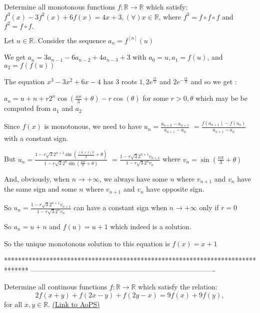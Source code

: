 \begin{solution}
	\begin{tcolorbox}Determine all monotonous functions $ f: \mathbb{R} \rightarrow \mathbb{R}$ which satisfy: $ f^3(x) - 3f^2(x) + 6f(x) = 4x + 3, (\forall) x \in \mathbb{R}$, where $ f^3 = f \circ f \circ f$ and $ f^2 = f \circ f.$\end{tcolorbox}

Let $ u\in\mathbb R$. Consider the sequence $ a_n=f^{[n]}(u)$

We get $ a_n=3a_{n-1}-6a_{n-2}+4a_{n-3}+3$ with $ a_0=u,a_1=f(u)$, and $ a_2=f(f(u))$

The equation $ x^3-3x^2+6x-4$ has 3 roots $ 1,2e^{\frac{i\pi}3}$ and $ 2e^{-\frac{i\pi}3}$ and so we get :

$ a_n=u+n+r2^n\cos(\frac{n\pi}3+\theta)-r\cos(\theta)$ for some $ r>0,\theta$ which may be be computed from $ a_1$ and $ a_2$

Since $ f(x)$ is monotonous, we need to have $ u_n=\frac{a_{n+2}-a_{n+1}}{a_{n+1}-a_n}$ $ =\frac{f(a_{n+1})-f(a_n)}{a_{n+1}-a_n}$ with a constant sign.

But $ u_n=\frac{1-r\sqrt 32^{n+1}\sin(\frac{(n+1)\pi}3+\theta)}{1-r\sqrt 32^{n}\sin(\frac{n\pi}3+\theta)}$ $ =\frac{1-r\sqrt 32^{n+1}v_{n+1}}{1-r\sqrt 32^{n}v_n}$ where $ v_n=\sin(\frac{n\pi}3+\theta)$

And, obviously, when $ n\to +\infty$, we always have some $ n$ where $ v_{n+1}$ and $ v_n$ have the same sign and some $ n$ where $ v_{n+1}$ and $ v_n$ have opposite sign.

So $ u_n=\frac{1-r\sqrt 32^{n+1}v_{n+1}}{1-r\sqrt 32^{n}v_n}$ can have a constant sign when $ n\to +\infty$ only if $ r=0$

So $ a_n=u+n$ and $ f(u)=u+1$ which indeed is a solution.

So the unique monotonous solution to this equation is $ \boxed{f(x)=x+1}$
\end{solution}
*******************************************************************************
-------------------------------------------------------------------------------

\begin{problem}
	Determine all continous functions $ f: \mathbb{R} \rightarrow \mathbb{R}$ which satisfy the relation:
\[2f(x+y)+f(2x-y)+f(2y-x)=9f(x)+9f(y),\]
for all $x,y \in \mathbb{R}$.
	\flushright \href{https://artofproblemsolving.com/community/c6h307282}{(Link to AoPS)}
\end{problem}



